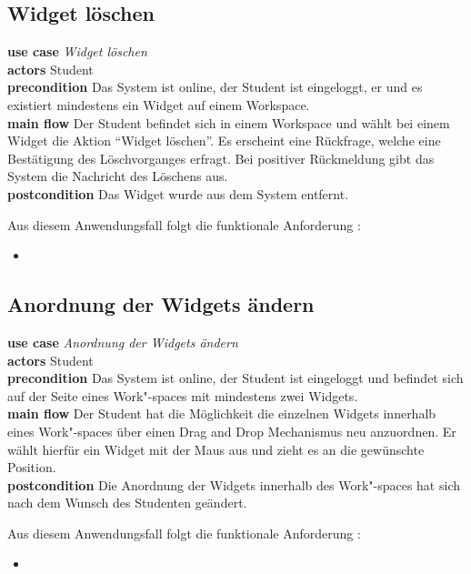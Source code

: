 \subsection{Widget löschen}
\textbf{use case} \emph{Widget löschen}\\
\textbf{actors} Student\\
\textbf{precondition} Das System ist online, der Student ist eingeloggt, er und es existiert mindestens ein Widget auf einem Workspace.\\
\textbf{main flow} Der Student befindet sich in einem Workspace und wählt bei einem Widget die Aktion "`Widget löschen"'. Es erscheint eine Rückfrage, welche eine Bestätigung des Löschvorganges erfragt. Bei positiver Rückmeldung gibt das System die Nachricht des Löschens aus.\\
\textbf{postcondition} Das Widget wurde aus dem System entfernt.
 
Aus diesem Anwendungsfall folgt die funktionale Anforderung :
\begin{itemize}
 \item \requirement{\requirementWidgetDelete}\label{requirementWidgetDelete}
\end{itemize}
 
\subsection{Anordnung der Widgets ändern}
\textbf{use case} \emph{Anordnung der Widgets ändern}\\
\textbf{actors} Student\\
\textbf{precondition} Das System ist online, der Student ist eingeloggt und befindet sich auf der Seite eines Work"-spaces mit mindestens zwei Widgets.\\
\textbf{main flow} Der Student hat die Möglichkeit die einzelnen Widgets innerhalb eines Work"-spaces über einen Drag and Drop Mechanismus neu anzuordnen. Er wählt hierfür ein Widget mit der Maus aus und zieht es an die gewünschte Position.\\
\textbf{postcondition} Die Anordnung der Widgets innerhalb des Work"-spaces hat sich nach dem Wunsch des Studenten geändert.
 
Aus diesem Anwendungsfall folgt die funktionale Anforderung :
\begin{itemize}
 \item \requirement{\requirementWidgetSortDragNDrop}\label{requirementWidgetSortDragNDrop}
\end{itemize}


